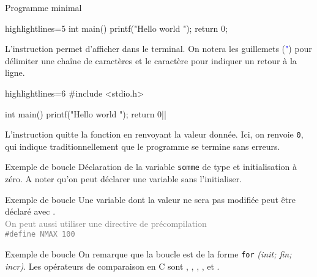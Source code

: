 \documentclass[10pt]{beamer}
\begin{document}
\begin{frame}[fragile]{\Ctitle}{\stitle}
\begin{exampleblock}{Programme minimal}
\begin{overprint}
\begin{langageC*}{highlightlines=5}
int main()
{
	printf("Hello world \n");
	return 0;
}
			\end{langageC*}
			\medskip
			L'instruction  permet d'afficher dans le terminal. On notera les guillemets (\textcolor{blue}{"}) pour délimiter une chaîne de caractères et le caractère  pour indiquer un retour à la ligne.
			\onslide<7>
			\begin{langageC*}{highlightlines=6}
#include <stdio.h>

int main()
{
	printf("Hello world \n");
	return 0|\myem{;}|
}
			\end{langageC*}
			\medskip
			L'instruction  quitte la fonction en renvoyant la valeur donnée. Ici, on renvoie {\tt 0}, qui indique traditionnellement que le programme se  termine sans erreurs.
		\end{overprint}
	\end{exampleblock}

\end{frame}

\begin{frame}{\Ctitle}{\stitle}
	\begin{exampleblock}{Exemple de boucle}
	\medskip
	Déclaration de la variable {\tt somme} de type  et initialisation à zéro. A noter qu'on peut déclarer une variable sans l'initialiser.
	\end{exampleblock}
\end{frame}

\begin{frame}{\Ctitle}{\stitle}
	\begin{exampleblock}{Exemple de boucle}
	\medskip
	Une variable dont la valeur ne sera pas modifiée peut être déclaré avec .\\
	\onslide<2-> \textcolor{gray}{On peut aussi utiliser une directive de précompilation \\ {\tt \#define NMAX 100}}
	\end{exampleblock}
\end{frame}

\begin{frame}{\Ctitle}{\stitle}
	\begin{exampleblock}{Exemple de boucle}
	\medskip
	On remarque que la boucle  est de la forme {\tt for} \textit{(init; fin; incr)}. Les opérateurs de comparaison en C sont \kw{==}, \kw{!=}, \kw{<}, \kw{>}, \kw{<=} et \kw{>=}.
	\end{exampleblock}
\end{frame}
\end{document}
